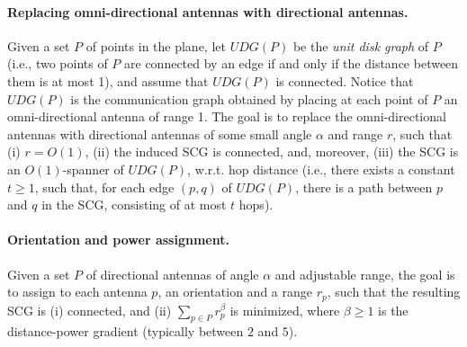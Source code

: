 \documentclass[11pt,letter]{article}
\def\UDG{{U\!DG}}
\begin{document}
\vspace{-2mm}
\paragraph{Replacing omni-directional antennas with directional antennas.}
Given a set $P$ of points in the plane, let $\UDG(P)$ be the {\em unit disk graph} of $P$ (i.e., two points of $P$ are connected by an edge if and only if the distance between them is at most 1), and assume that $\UDG(P)$ is connected. Notice that $\UDG(P)$ is the communication graph obtained by placing at each point of $P$ an omni-directional antenna of range 1.
The goal is to replace the omni-directional antennas with directional antennas of some small angle $\alpha$ and range $r$, such that (i) $r=O(1)$, (ii) the induced SCG is connected, and, moreover, (iii) the SCG is an $O(1)$-spanner of $\UDG(P)$, w.r.t. hop distance (i.e., there exists a constant $t \ge 1$, such that, for each edge $(p,q)$ of $\UDG(P)$, there is a path between $p$ and $q$ in the SCG, consisting of at most $t$ hops).

\vspace{-2mm}
\paragraph{Orientation and power assignment.}
Given a set $P$ of directional antennas of angle $\alpha$ and adjustable range, the goal is to assign to each antenna $p$, an orientation and a range $r_p$, such that the resulting SCG is (i) connected, and (ii) $\sum_{p \in P} r_p^\beta$ is minimized, where $\beta \ge 1$ is the distance-power gradient (typically between $2$ and $5$).
\end{document}
